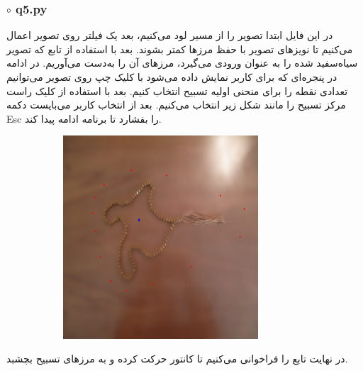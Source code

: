 \documentclass[a4paper,12pt]{article}
\begin{document}
	\subsubsection*{$\circ$ q5.py} 
	در این فایل ابتدا تصویر 
	را از مسیر
	لود می‌کنیم، بعد یک فیلتر 
	روی تصویر اعمال ‌می‌کنیم تا نویزهای تصویر با حفظ مرزها کمتر بشوند. بعد با استفاده از تابع 
	که تصویر سیاه‌سفید شده را به عنوان ورودی می‌گیرد، مرزهای آن را به‌دست می‌آوریم. در ادامه در  پنجره‌‌ای که برای کاربر نمایش داده می‌شود با کلیک چپ روی تصویر می‌توانیم تعدادی نقطه را برای منحنی اولیه تسبیح انتخاب کنیم. بعد با استفاده از کلیک راست مرکز تسبیح را مانند شکل زیر انتخاب می‌کنیم. بعد از انتخاب کاربر می‌بایست دکمه Esc را بفشارد تا برنامه ادامه پیدا کند.
	\begin{figure}[H]
		\centering
		\begin{subfigure}{0.6\textwidth}
			\centering
			\includegraphics[width=0.8\textwidth]{1.png}
		\end{subfigure}
	\end{figure} 
	در نهایت تابع  
	 را فراخوانی می‌کنیم تا کانتور حرکت کرده و به مرزهای تسبیح بچشبد.
\end{document}
